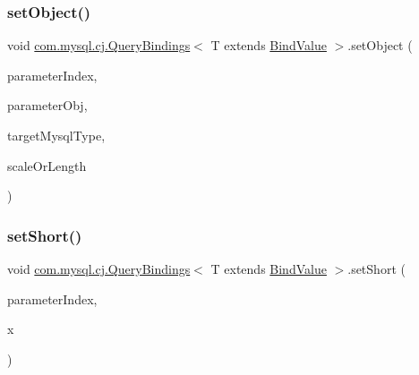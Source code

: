 \mbox{\label{interfacecom_1_1mysql_1_1cj_1_1_query_bindings_a41fd893683bfdd90551e4d9726fca0ff}} 
\subsubsection{\texorpdfstring{set\+Object()}{setObject()}\hspace{0.1cm}{\footnotesize\ttfamily [3/3]}}
{\footnotesize\ttfamily void \mbox{\hyperlink{interfacecom_1_1mysql_1_1cj_1_1_query_bindings}{com.\+mysql.\+cj.\+Query\+Bindings}}$<$ T extends \mbox{\hyperlink{interfacecom_1_1mysql_1_1cj_1_1_bind_value}{Bind\+Value}} $>$.set\+Object (\begin{DoxyParamCaption}\item[{int}]{parameter\+Index,  }\item[{Object}]{parameter\+Obj,  }\item[{\mbox{\hyperlink{enumcom_1_1mysql_1_1cj_1_1_mysql_type}{Mysql\+Type}}}]{target\+Mysql\+Type,  }\item[{int}]{scale\+Or\+Length }\end{DoxyParamCaption})}

\mbox{\label{interfacecom_1_1mysql_1_1cj_1_1_query_bindings_afcbad5dc3cea800a90ee9d5a42b5dc7d}} 
\subsubsection{\texorpdfstring{set\+Short()}{setShort()}}
{\footnotesize\ttfamily void \mbox{\hyperlink{interfacecom_1_1mysql_1_1cj_1_1_query_bindings}{com.\+mysql.\+cj.\+Query\+Bindings}}$<$ T extends \mbox{\hyperlink{interfacecom_1_1mysql_1_1cj_1_1_bind_value}{Bind\+Value}} $>$.set\+Short (\begin{DoxyParamCaption}\item[{int}]{parameter\+Index,  }\item[{short}]{x }\end{DoxyParamCaption})}

